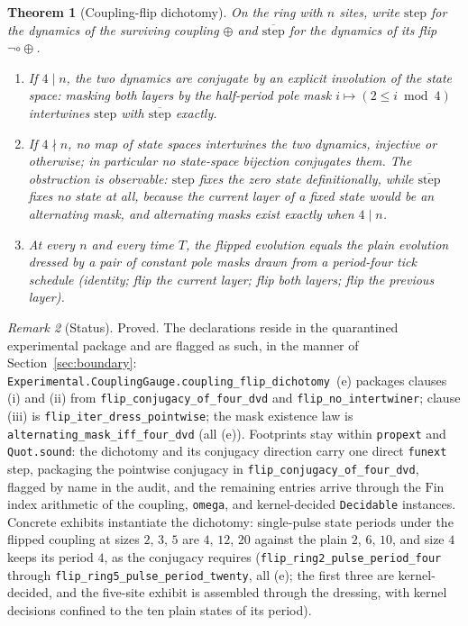 \documentclass[11pt,a4paper]{article}
\theoremstyle{plain}
\newtheorem{theorem}{Theorem}[section]
\theoremstyle{definition}
\theoremstyle{remark}
\newtheorem{remark}[theorem]{Remark}
\newcommand{\comp}{\circ}
\begin{document}
\begin{theorem}[Coupling-flip dichotomy]
\label{thm:flipgauge}
On the ring with $n$ sites, write $\mathrm{step}$ for the dynamics of
the surviving coupling $\oplus$ and $\overline{\mathrm{step}}$ for
the dynamics of its flip $\neg\comp\oplus$.
\begin{enumerate}[label=(\roman*)]
\item If $4\mid n$, the two dynamics are conjugate by an explicit
involution of the state space: masking both layers by the
half-period pole mask $i\mapsto (2\le i \bmod 4)$ intertwines
$\mathrm{step}$ with $\overline{\mathrm{step}}$ exactly.
\item If $4\nmid n$, no map of state spaces intertwines the two
dynamics, injective or otherwise; in particular no state-space
bijection conjugates them. The obstruction is observable:
$\mathrm{step}$ fixes the zero state definitionally, while
$\overline{\mathrm{step}}$ fixes no state at all, because the
current layer of a fixed state would be an alternating mask, and
alternating masks exist exactly when $4\mid n$.
\item At every $n$ and every time $T$, the flipped evolution equals
the plain evolution dressed by a pair of constant pole masks drawn
from a period-four tick schedule (identity; flip the current layer;
flip both layers; flip the previous layer).
\end{enumerate}
\end{theorem}

\begin{remark}[Status]
Proved. The declarations reside in the quarantined experimental
package and are flagged as such, in the manner of
Section~\ref{sec:boundary}:
\texttt{Experimental.CouplingGauge.coupling\_flip\_dichotomy}~(e)
packages clauses (i) and (ii) from
\texttt{flip\_conjugacy\_of\_four\_dvd} and
\texttt{flip\_no\_intertwiner}; clause (iii) is
\texttt{flip\_iter\_dress\_pointwise}; the mask existence law is
\texttt{alternating\_mask\_iff\_four\_dvd} (all (e)). Footprints stay
within \texttt{propext} and \texttt{Quot.sound}: the dichotomy and
its conjugacy direction carry one direct \texttt{funext} step,
packaging the pointwise conjugacy in
\texttt{flip\_conjugacy\_of\_four\_dvd}, flagged by name in the
audit, and the remaining entries arrive through the $\mathrm{Fin}$
index arithmetic of the coupling, \texttt{omega}, and kernel-decided
\texttt{Decidable} instances. Concrete exhibits
instantiate the dichotomy: single-pulse state periods under the
flipped coupling at sizes $2$, $3$, $5$ are $4$, $12$, $20$ against
the plain $2$, $6$, $10$, and size $4$ keeps its period $4$, as the
conjugacy requires (\texttt{flip\_ring2\_pulse\_period\_four} through
\texttt{flip\_ring5\_pulse\_period\_twenty}, all (e); the first three
are kernel-decided, and the five-site exhibit is assembled through
the dressing, with kernel decisions confined to the ten plain
states of its period).
\end{remark}
\end{document}
